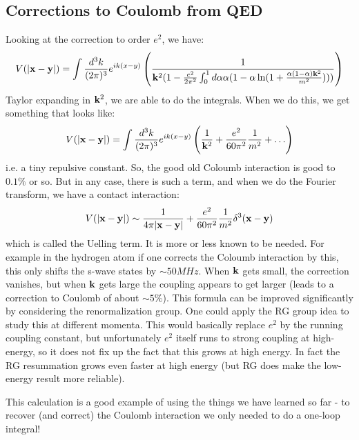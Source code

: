 \subsection{Corrections to Coulomb from QED}
Looking at the correction to order $e^2$, we have:
\begin{equation}
    V(\lvert \mathbf{x} - \mathbf{y} \rvert) = \int \frac{d^3k}{(2\pi)^3}e^{ik(x - y)}\left(\frac{1}{\mathbf{k}^2(1 - \frac{e^2}{2\pi^2}\int_0^1 d\alpha \alpha (1 - \alpha \ln(1 + \frac{\alpha(1-\alpha)\mathbf{k}^2}{m^2})))}\right)
\end{equation}
Taylor expanding in $\mathbf{k}^2$, we are able to do the integrals. When we do this, we get something that looks like:
\begin{equation}
    V(\lvert \mathbf{x} - \mathbf{y} \rvert) = \int \frac{d^3k}{(2\pi)^3}e^{ik(x - y)}\left(\frac{1}{\mathbf{k}^2} + \frac{e^2}{60\pi^2}\frac{1}{m^2} + \ldots\right)
\end{equation}
i.e. a tiny repulsive constant. So, the good old Coloumb interaction is good to $0.1\%$ or so. But in any case, there is such a term, and when we do the Fourier transform, we have a contact interaction:
\begin{equation}
    V(\lvert \mathbf{x} - \mathbf{y} \rvert) \sim \frac{1}{4\pi\lvert \mathbf{x} - \mathbf{y} \rvert} + \frac{e^2}{60\pi^2}\frac{1}{m^2}\delta^3(\mathbf{x} - \mathbf{y})
\end{equation}
which is called the Uelling term. It is more or less known to be needed. For example in the hydrogen atom if one corrects the Coloumb interaction by this, this only shifts the s-wave states by $\sim 50\si{MHz}$. When $\mathbf{k}$ gets small, the correction vanishes, but when $\mathbf{k}$ gets large the coupling appears to get larger (leads to a correction to Coulomb of about $\sim 5\%$). This formula can be improved significantly by considering the renormalization group. One could apply the RG group idea to study this at different momenta. This would basically replace $e^2$ by the running coupling constant, but unfortunately $e^2$ itself runs to strong coupling at high-energy, so it does not fix up the fact that this grows at high energy. In fact the RG resummation grows even faster at high energy (but RG does make the low-energy result more reliable).

This calculation is a good example of using the things we have learned so far - to recover (and correct) the Coulomb interaction we only needed to do a one-loop integral!

